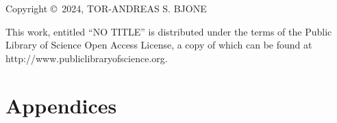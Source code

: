 \documentclass[a4paper,11pt]{book}
\title{\mintittel}
\author{TOR-ANDREAS S. BJONE}
\date{\today}
\newcommand{\mintittel}{NO TITLE}
\begin{document}

\vspace*{18cm}
\noindent Copyright \copyright$\,$ 2024, TOR-ANDREAS S. BJONE 
\vspace{4mm}

\noindent This work, entitled ``\mintittel'' is distributed under the
terms of the Public Library of Science Open Access License, a copy of which can be found at
http://www.publiclibraryofscience.org. 



\tableofcontents

\listoffigures
\newpage
\thispagestyle{empty}
\mbox{}

\newpage
\pagestyle{fancyplain}






%
%
%
%
%
%
%
	
\part*{Appendices}
\appendix
%




%
\end{document}
